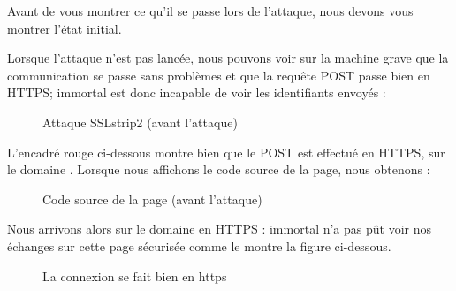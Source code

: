 Avant de vous montrer ce qu'il se passe lors de l'attaque, nous devons vous montrer l'état initial.

Lorsque l'attaque n'est pas lancée, nous pouvons voir sur la machine grave que la communication se passe sans problèmes et que la requête POST passe bien en HTTPS; immortal est donc incapable de voir les identifiants envoyés :

\begin{figure}[H]
  \caption{Attaque SSLstrip2 (avant l'attaque)}
\end{figure}

L'encadré rouge ci-dessous montre bien que le POST est effectué en HTTPS, sur le domaine . Lorsque nous affichons le code source de la page, nous obtenons :

\begin{figure}[H]
  \caption{Code source de la page (avant l'attaque)}
\end{figure}

Nous arrivons alors sur le domaine  en HTTPS : immortal n'a pas pût voir nos échanges sur cette page sécurisée comme le montre la figure ci-dessous.

\begin{figure}[H]
  \caption{La connexion se fait bien en https}
\end{figure}

